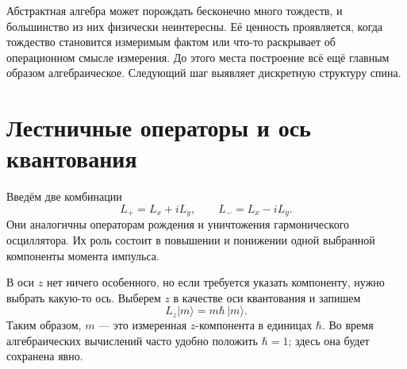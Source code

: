 \begin{classroomqa}    \end{classroomqa}

Абстрактная алгебра может порождать бесконечно много тождеств, и большинство из них физически неинтересны. Её ценность проявляется, когда тождество становится измеримым фактом или что-то раскрывает об операционном смысле измерения. До этого места построение всё ещё главным образом алгебраическое. Следующий шаг выявляет дискретную структуру спина.

\begin{classroomqa}    \end{classroomqa}

\section{Лестничные операторы и ось квантования}

Введём две комбинации \begin{equation}
L_+=L_x+iL_y,
\qquad
L_-=L_x-iL_y.
\end{equation} Они аналогичны операторам рождения и уничтожения гармонического осциллятора. Их роль состоит в повышении и понижении одной выбранной компоненты момента импульса.

В оси \(z\) нет ничего особенного, но если требуется указать компоненту, нужно выбрать какую-то ось. Выберем \(z\) в качестве оси квантования и запишем \begin{equation}
L_z\lvert m\rangle=m\hbar\,\lvert m\rangle.
\end{equation} Таким образом, \(m\) — это измеренная \(z\)-компонента в единицах \(\hbar\). Во время алгебраических вычислений часто удобно положить \(\hbar=1\); здесь она будет сохранена явно.

